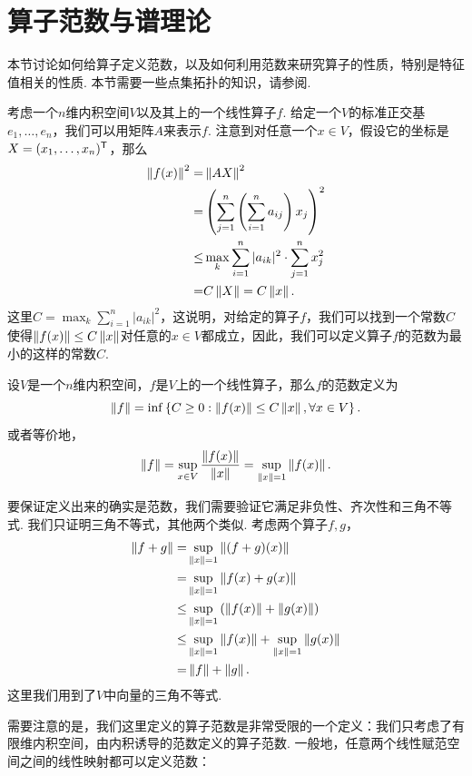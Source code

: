\section{算子范数与谱理论}\label{sec:operator-norm}

本节讨论如何给算子定义范数，以及如何利用范数来研究算子的性质，特别是特征值相关的性质. 本节需要一些点集拓扑的知识，请参阅.

考虑一个$n$维内积空间$V$以及其上的一个线性算子$f$. 给定一个$V$的标准正交基$e_1,\dots,e_n$，我们可以用矩阵$A$来表示$f$. 注意到对任意一个$x\in V$，假设它的坐标是$X=(x_1,\dots,x_n)^{\mathsf{T}}$，那么
\begin{align*}
    \left\|f(x)\right\|^2=&\left\|AX\right\|^2\\
    =&\left(\sum_{j=1}^n\left(\sum_{i=1}^na_{ij}\right)x_j\right)^2\\
    \leq &\max_{k}\sum_{i=1}^n|a_{ik}|^2\cdot\sum_{j=1}^n x_j^2\\
    =&C\left\|X\right\|=C\left\|x\right\|.
\end{align*}
这里$C=\max_{k}\sum_{i=1}^n|a_{ik}|^2$，这说明，对给定的算子$f$，我们可以找到一个常数$C$使得$\left\|f(x)\right\|\leq C\left\|x\right\|$对任意的$x\in V$都成立，因此，我们可以定义算子$f$的范数为最小的这样的常数$C$. 

\begin{definition}[算子范数]
    设$V$是一个$n$维内积空间，$f$是$V$上的一个线性算子，那么$f$的范数定义为
    \[\left\|f\right\|=\inf\left\{C\geq 0:\left\|f(x)\right\|\leq C\left\|x\right\|,\forall x\in V\right\}.\]
或者等价地，
\[\left\|f\right\|=\sup_{x\in V}\frac{\left\|f(x)\right\|}{\left\|x\right\|}=\sup_{\left\|x\right\|=1}\left\|f(x)\right\|.\]
\end{definition}

要保证定义出来的确实是范数，我们需要验证它满足非负性、齐次性和三角不等式. 我们只证明三角不等式，其他两个类似. 考虑两个算子$f,g$，
\begin{align*}
    \left\|f+g\right\|=&\sup_{\left\|x\right\|=1}\left\|(f+g)(x)\right\|\\
    =&\sup_{\left\|x\right\|=1}\left\|f(x)+g(x)\right\|\\
    \leq&\sup_{\left\|x\right\|=1}\left(\left\|f(x)\right\|+\left\|g(x)\right\|\right)\\
    \leq&\sup_{\left\|x\right\|=1}\left\|f(x)\right\|+\sup_{\left\|x\right\|=1}\left\|g(x)\right\|\\
    =&\left\|f\right\|+\left\|g\right\|.
\end{align*}
这里我们用到了$V$中向量的三角不等式. 

需要注意的是，我们这里定义的算子范数是非常受限的一个定义：我们只考虑了有限维内积空间，由内积诱导的范数定义的算子范数. 一般地，任意两个线性赋范空间之间的线性映射都可以定义范数：

